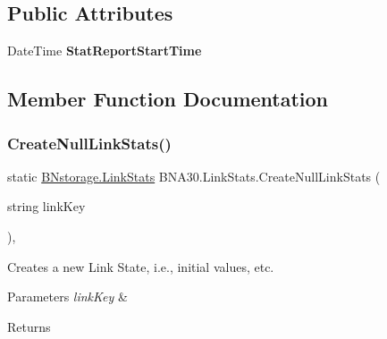 \subsection*{Public Attributes}
\begin{DoxyCompactItemize}
\item 
\mbox{\label{class_b_n_a30_1_1_link_stats_a73347a99b00e43db473b73dc0dd71a96}} 
Date\+Time {\bfseries Stat\+Report\+Start\+Time}
\end{DoxyCompactItemize}


\subsection{Member Function Documentation}
\mbox{\label{class_b_n_a30_1_1_link_stats_ada0708851c4f4b61760571f231a058c8}} 
\subsubsection{\texorpdfstring{CreateNullLinkStats()}{CreateNullLinkStats()}}
{\footnotesize\ttfamily static \mbox{\hyperlink{struct_b_n_a30_1_1_b_nstorage_1_1_link_stats}{B\+Nstorage.\+Link\+Stats}} B\+N\+A30.\+Link\+Stats.\+Create\+Null\+Link\+Stats (\begin{DoxyParamCaption}\item[{string}]{link\+Key }\end{DoxyParamCaption})\hspace{0.3cm}{\ttfamily [inline]}, {\ttfamily [static]}}



Creates a new Link State, i.\+e., initial values, etc. 


\begin{DoxyParams}{Parameters}
{\em link\+Key} & \\
\hline
\end{DoxyParams}
\begin{DoxyReturn}{Returns}

\end{DoxyReturn}
\mbox{\label{class_b_n_a30_1_1_link_stats_a16cc07fd987c78e68497086dab5258fe}} 
